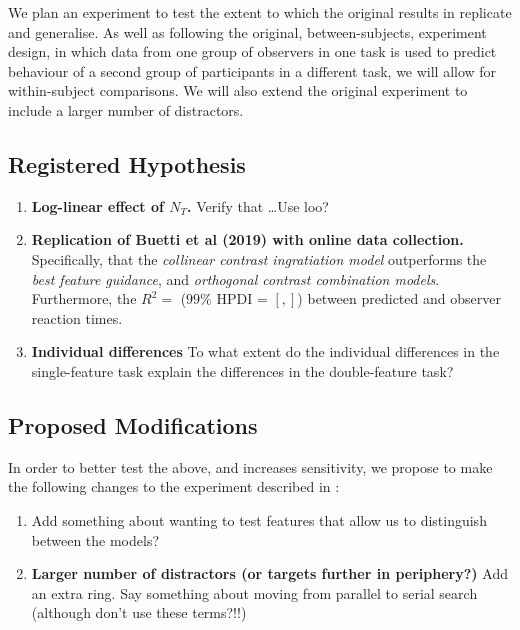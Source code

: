 \documentclass[smallextended, natbib]{svjour3}       %
\begin{document}
We plan an experiment to test the extent to which the original results in \cite{buetti2019predicting} replicate and generalise. As well as following the original, between-subjects, experiment design, in which data from one group of observers in one task is used to predict behaviour of a second group of participants in a different task, we will allow for within-subject comparisons. We will also extend the original experiment to include a larger number of distractors. 

\subsection{Registered Hypothesis}

\begin{enumerate}
\item \textbf{Log-linear effect of $N_T$.} Verify that \ldots Use loo? \\
\item \textbf{Replication of Buetti et al (2019) with online data collection.} Specifically, that the \textit{collinear contrast ingratiation model} outperforms the \textit{best feature guidance}, and \textit{orthogonal contrast combination models}.  Furthermore, the $R^2 = $ ($99\%$ HPDI = $[, ]$) between predicted and observer reaction times.\\
 
\item \textbf{Individual differences} To what extent do the individual differences in the single-feature task explain the differences in the double-feature task?
\end{enumerate}

\subsection{Proposed Modifications}

In order to better test the above, and increases sensitivity, we propose to make the following changes to the experiment described in \cite{buetti2019predicting}:

\begin{enumerate}
\item Add something about wanting to test features that allow us to distinguish between the models?
\\
\item \textbf{Larger number of distractors (or targets further in periphery?)} Add an extra ring. Say something about moving from parallel to serial search (although don't use these terms?!!) \\ 
\end{enumerate}
\end{document}
